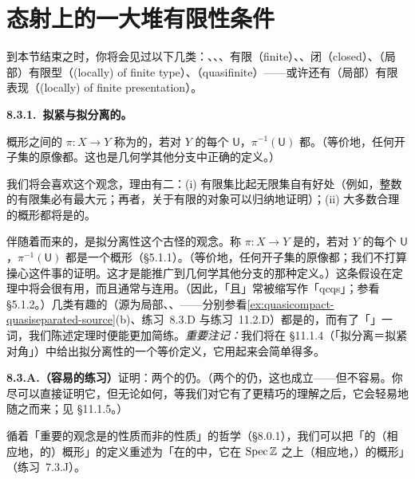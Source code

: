 
\section{态射上的一大堆有限性条件}

到本节结束之时，你将会见过以下几类\trMorphism：\trQuasicompact、\trQuasiSeparated、\trAffine、有限（finite）、\trIntegral、闭（closed）、（局部）有限型（(locally) of finite type）、\trQuasifinite{}（quasifinite）——或许还有（局部）有限表现（(locally) of finite presentation）。

\textbf{8.3.1.\ 拟紧与拟分离的\trMorphism。}

概形之间的\trMorphism{} $\pi\colon X\to Y$ 称为\textbf{\trQuasicompact}的，若对 $Y$ 的每个\trAffine\trOpenSubset{} $\mathsf{U}$，$\pi^{-1}(\mathsf{U})$ 都\trQuasicompact。（等价地，任何\trQuasicompact{}开子集的原像都\trQuasicompact。这也是几何学其他分支中正确的定义。）

我们将会喜欢这个观念，理由有二：(i) 有限集比起无限集自有好处（例如，整数的有限集必有最大元；再者，关于有限的对象可以归纳地证明）；(ii) 大多数合理的概形都将是\trQuasicompact{}的。

伴随着\trQuasicompactness{}而来的，是拟分离性这个古怪的观念。称\trMorphism{} $\pi\colon X\to Y$ 是\textbf{\trQuasiSeparated}的，若对 $Y$ 的每个\trAffine\trOpenSubset{} $\mathsf{U}$，$\pi^{-1}(\mathsf{U})$ 都是一个\trQuasiSeparated{}概形（\S5.1.1）。（等价地，任何\trQuasiSeparated{}开子集的原像都\trQuasiSeparated；我们不打算操心这件事的证明。这才是能推广到几何学其他分支的那种定义。）这条假设在定理中将会很有用，而且通常与\trQuasicompactness{}连用。（因此，「\trQuasicompact{}且\trQuasiSeparated」常被缩写作「qcqs」；参看 \S5.1.2。）几类有趣的\trMorphism（源为局部\trNoetherian、\trAffine、\trSeparated——分别参看\cref{ex:quasicompact-quasiseparated-source}(b)、练习~8.3.D 与\mbox{练习~11.2.D}）都是\trQuasiSeparated{}的，而有了「\trQuasiSeparated」一词，我们陈述定理时便能更加简练。\emph{重要注记：}我们将在 \S11.1.4（「拟分离＝拟紧对角」）中给出拟分离性的一个等价定义，它用起来会简单得多。

\textbf{8.3.A.（容易的练习）}\quad 证明：两个\trQuasicompact{}\trMorphism{}的\trComposition{}仍\trQuasicompact。（两个\trQuasiSeparated{}\trMorphism{}的\trComposition{}仍\trQuasiSeparated，这也成立——但不容易。你尽可以直接证明它，但无论如何，等我们对它有了更精巧的理解之后，它会轻易地随之而来；见 \S11.1.5。）

循着\trGrothendieck{}「重要的观念是\trMorphism{}的性质而非\trObject{}的性质」的哲学（\S8.0.1），我们可以把「\trQuasicompact 的（相应地，\trQuasiSeparated 的）概形」的定义重述为「在\trScheme{}的\trCategory{}中，它在\trFinalObject{} $\operatorname{Spec}\mathbb{Z}$ 之上\trQuasicompact（相应地，\trQuasiSeparated）的概形」（练习~7.3.J）。

